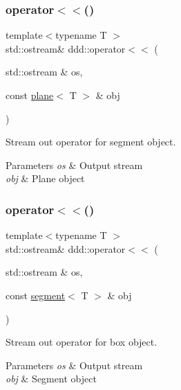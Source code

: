 \subsubsection{\texorpdfstring{operator$<$$<$()}{operator<<()}\hspace{0.1cm}{\footnotesize\ttfamily [5/10]}}
{\footnotesize\ttfamily template$<$typename T $>$ \\
std\+::ostream\& ddd\+::operator$<$$<$ (\begin{DoxyParamCaption}\item[{std\+::ostream \&}]{os,  }\item[{const \hyperlink{classddd_1_1plane}{plane}$<$ T $>$ \&}]{obj }\end{DoxyParamCaption})\hspace{0.3cm}{\ttfamily [inline]}}



Stream out operator for segment object. 


\begin{DoxyParams}{Parameters}
{\em os} & Output stream \\
\hline
{\em obj} & Plane object \\
\hline
\end{DoxyParams}
\mbox{\label{namespaceddd_a59e2fa950fd945aa8b3dd550720ad3f5}} 
\subsubsection{\texorpdfstring{operator$<$$<$()}{operator<<()}\hspace{0.1cm}{\footnotesize\ttfamily [6/10]}}
{\footnotesize\ttfamily template$<$typename T $>$ \\
std\+::ostream\& ddd\+::operator$<$$<$ (\begin{DoxyParamCaption}\item[{std\+::ostream \&}]{os,  }\item[{const \hyperlink{classddd_1_1segment}{segment}$<$ T $>$ \&}]{obj }\end{DoxyParamCaption})\hspace{0.3cm}{\ttfamily [inline]}}



Stream out operator for box object. 


\begin{DoxyParams}{Parameters}
{\em os} & Output stream \\
\hline
{\em obj} & Segment object \\
\hline
\end{DoxyParams}
\mbox{\label{namespaceddd_af710b0f11be50190553c743ce86545a3}} 
